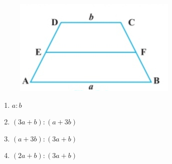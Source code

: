 \documentclass{article}
\begin{document}
\begin{enumerate}
\begin{figure}[!h]
\begin{center}
\includegraphics[width=\columnwidth]{figs/six.jpg}
\end{center}
\caption{}
\label{fig: Figure 4}
\end{figure}
\begin{enumerate}
\item $a:b$ 
\item $(3a+b):(a+3b)$  
\item $(a+3b):(3a+b)$
\item $(2a+b):(3a+b)$
\end{enumerate}
\end{enumerate}
\end{document}
